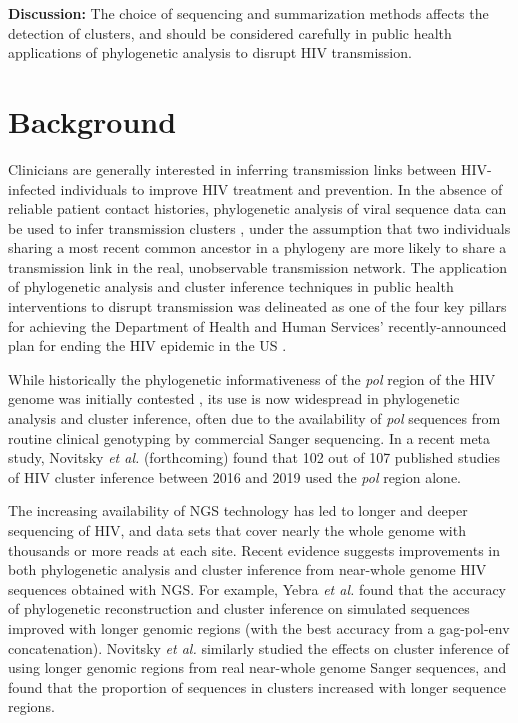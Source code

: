 \documentclass[letterpaper]{article}
\begin{document}
\textbf{Discussion:} The choice of sequencing and summarization methods affects the detection of clusters, and should be considered carefully in public health applications of phylogenetic analysis to disrupt HIV transmission.

\section*{Background}

Clinicians are generally interested in inferring transmission links between HIV-infected individuals to improve HIV treatment and prevention. In the absence of reliable patient contact histories, phylogenetic analysis of viral sequence data can be used to infer transmission clusters \parencite{leitner}, under the assumption that two individuals sharing a most recent common ancestor in a phylogeny are more likely to share a transmission link in the real, unobservable transmission network. The application of phylogenetic analysis and cluster inference techniques in public health interventions to disrupt transmission was delineated as one of the four key pillars for achieving the Department of Health and Human Services' recently-announced plan for ending the HIV epidemic in the US \parencite{fauci}.

While historically the phylogenetic informativeness of the \emph{pol} region of the HIV genome was initially contested \parencite{hue, sturmer}, its use is now widespread in phylogenetic analysis and cluster inference, often due to the availability of \emph{pol} sequences from routine clinical genotyping by commercial Sanger sequencing. In a recent meta study, Novitsky \emph{et al.} (forthcoming) found that 102 out of 107 published studies of HIV cluster inference between 2016 and 2019 used the \emph{pol} region alone.

The increasing availability of NGS technology has led to longer and deeper sequencing of HIV, and data sets that cover nearly the whole genome with thousands or more reads at each site. Recent evidence suggests improvements in both phylogenetic analysis and cluster inference from near-whole genome HIV sequences obtained with NGS. For example, Yebra \emph{et al.} \parencite{yebra} found that the accuracy of phylogenetic reconstruction and cluster inference on simulated sequences improved with longer genomic regions (with the best accuracy from a gag-pol-env concatenation). Novitsky \emph{et al.} \parencite{novitsky} similarly studied the effects on cluster inference of using longer genomic regions from real near-whole genome Sanger sequences, and found that the proportion of sequences in clusters increased with longer sequence regions.
\end{document}
